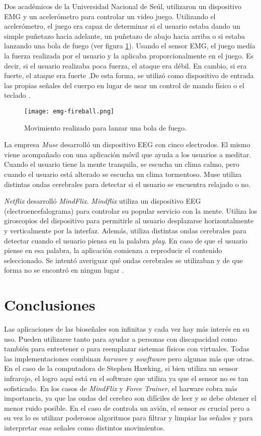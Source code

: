 Dos académicos de la Universidad Nacional de Seúl, utilizaron un dispositivo EMG y un acelerómetro para controlar un video juego. Utilizando el acelerómetro, el juego era capaz de determinar si el usuario estaba dando un simple puñetazo hacia adelante, un puñetazo de abajo hacia arriba o si estaba lanzando una bola de fuego (ver 
figura \ref{fig:fireball}). Usando el sensor EMG, el juego medía la fuerza realizada por el usuario y la aplicaba proporcionalmente en el juego. Es decir, si el usuario realizaba poca fuerza, el ataque era débil. En cambio, si era fuerte, el ataque era fuerte .De esta forma, se utilizó como dispositivo de entrada las propias señales del cuerpo en lugar de usar un control de mando físico o el teclado \cite{emg-fireball}.

\begin{figure}[H]
    \texttt{[image: emg-fireball.png]}
    \caption{Movimiento realizado para lanzar una bola de fuego.}
	\label{fig:fireball}
\end{figure}

La empresa \emph{Muse} desarrolló un dispositivo EEG con cinco electrodos. El mismo viene acompañado con una aplicación móvil que ayuda a los usuarios a meditar. Cuando el usuario tiene la mente tranquila, se escucha un clima calmo, pero cuando el usuario está alterado se escucha un clima tormentoso. Muse utiliza distintas ondas cerebrales para detectar si el usuario se encuentra relajado o no.

\emph{Netflix} desarrolló \emph{MindFlix}. \emph{Mindflix} utiliza un dispositivo EEG (electroencefalograma) para controlar su popular servicio con la mente. Utiliza los giroscopios del dispositivo para permitirle al usuario desplazarse horizontalmente y verticalmente por la interfaz. Además, utiliza distintas ondas cerebrales para detectar cuando el usuario piensa en la palabra \emph{play}. En caso de que el usuario piense en esa palabra,  la aplicación comienza a reproducir el contenido seleccionado. Se intentó averiguar qué ondas cerebrales se utilizaban y de que forma no se encontró en ningun lugar \cite{mindflix}.


\section{Conclusiones}

Las aplicaciones de las bioseñales son infinitas y cada vez hay más interés en su uso. Pueden utilizarse tanto para ayudar a personas con discapacidad como también para entretener o para reemplazar sistemas físicos con virtuales. Todas las implementaciones combinan \emph{harware} y \emph{sowftware} pero algunas más que otras. En el caso de la computadora de Stephen Hawking, si bien utiliza un sensor infrarojo, el logro aquí está en el software que utiliza ya que el sensor no es tan sofisticado. En los casos de \emph{MindFlix} y \emph{Force Trainer}, el harware cobra más importancia, ya que las ondas del cerebro son difíciles de leer y se debe obtener el menor ruido posible. En el caso de controla un avión, el sensor es crucial pero a su vez lo es utilizar poderosos algoritmos para filtrar y limpiar las señales y para interpretar esas señales como distintos movimientos.

